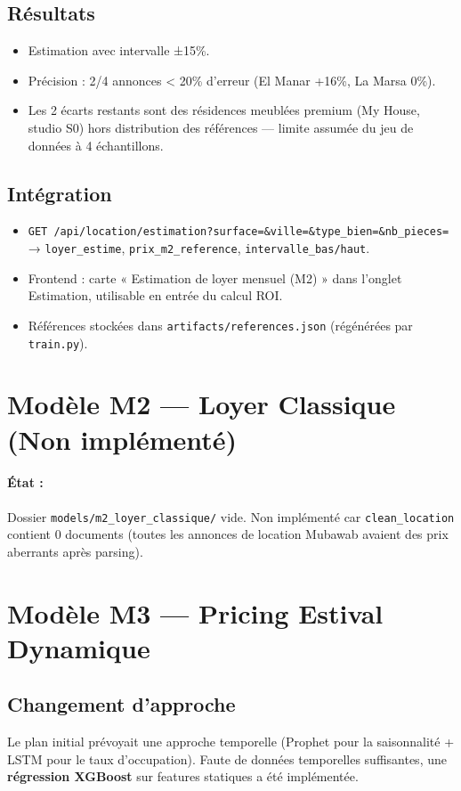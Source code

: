 \documentclass[12pt,a4paper]{report}
\begin{document}
\subsection{Résultats}
\begin{itemize}
    \item Estimation avec intervalle ±15\%.
    \item Précision : 2/4 annonces < 20\% d'erreur (El Manar +16\%, La Marsa 0\%).
    \item Les 2 écarts restants sont des résidences meublées premium (My House, studio S0) hors distribution des références — limite assumée du jeu de données à 4 échantillons.
\end{itemize}

\subsection{Intégration}
\begin{itemize}
    \item \texttt{GET /api/location/estimation?surface=\&ville=\&type\_bien=\&nb\_pieces=} → \texttt{loyer\_estime}, \texttt{prix\_m2\_reference}, \texttt{intervalle\_bas/haut}.
    \item Frontend : carte « Estimation de loyer mensuel (M2) » dans l'onglet Estimation, utilisable en entrée du calcul ROI.
    \item Références stockées dans \texttt{artifacts/references.json} (régénérées par \texttt{train.py}).
\end{itemize}

\section{Modèle M2 — Loyer Classique (Non implémenté)}

\paragraph{État :} Dossier \texttt{models/m2\_loyer\_classique/} vide. Non implémenté car \texttt{clean\_location} contient 0 documents (toutes les annonces de location Mubawab avaient des prix aberrants après parsing).

\section{Modèle M3 — Pricing Estival Dynamique}

\subsection{Changement d'approche}
Le plan initial prévoyait une approche temporelle (Prophet pour la saisonnalité + LSTM pour le taux d'occupation). Faute de données temporelles suffisantes, une \textbf{régression XGBoost} sur features statiques a été implémentée.
\end{document}
